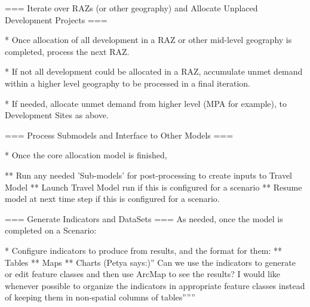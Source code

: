 === Iterate over RAZs (or other geography) and Allocate Unplaced Development Projects ===

* Once allocation of all development in a RAZ or other mid-level geography is completed, process the next RAZ.  

* If not all development could be allocated in a RAZ, accumulate unmet demand within a higher level geography to be processed in a final iteration.

* If needed, allocate unmet demand from higher level (MPA for example), to Development Sites as above.

=== Process Submodels and Interface to Other Models ===

* Once the core allocation model is finished,

** Run any needed 'Sub-models' for post-processing to create inputs to Travel Model
** Launch Travel Model run if this is configured for a scenario
** Resume model at next time step if this is configured for a scenario.

=== Generate Indicators and DataSets ===
As needed, once the model is completed on a Scenario:

* Configure indicators to produce from results, and the format for them:
** Tables
** Maps
** Charts
(Petya says:)'' Can we use the indicators to generate or edit feature classes and then use ArcMap to see the results? I would like whenever possible to organize the indicators in appropriate feature classes instead of keeping them in non-spatial columns of tables''''''

